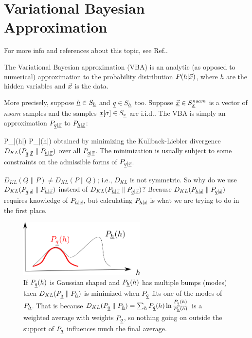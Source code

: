 \chapter{Variational Bayesian Approximation}

For more info and references about
this topic, see Ref.\cite{wiki-var-bay}.

The Variational Bayesian approximation (VBA)
is an analytic 
(as opposed to numerical) approximation
to the probability 
distribution $P(h|{\vec{x}})$,
where $h$ are the hidden variables 
and ${\vec{x}}$ is the data. 


More precisely, suppose ${\underline{h}}\in S_{\underline{h}}$ and ${\underline{q}}\in S_{\underline{h}}$ too.
Suppose $\vec{{\underline{x}}}\in S_{\underline{x}}^{nsam}$
 is a vector of $nsam$ samples
and the samples ${\underline{x}}[\sigma]\in S_{\underline{x}}$ are i.i.d..
 The VBA is simply 
an approximation
$P_{{\underline{q}}|\vec{{\underline{x}}}}$ to
$P_{{\underline{h}}|\vec{{\underline{x}}}}$:


\beq
P_{\rvh|\vec{\rvx}}(h|\vecx)
\approx P_{\rvq|\vec{\rvx}}(h|\vecx)
\eeq
obtained by minimizing the Kullback-Liebler divergence
$D_{KL}(P_{{\underline{q}}|\vec{{\underline{x}}}}\parallel
P_{{\underline{h}}|\vec{{\underline{x}}}})$
over all 
$P_{{\underline{q}}|\vec{{\underline{x}}}}$. The minimization
is 
usually subject to some constraints
on the admissible forms of 
$P_{{\underline{q}}|\vec{{\underline{x}}}}$.


$D_{KL}(Q\parallel P)\neq
D_{KL}(P\parallel Q)$; i.e.,  $D_{KL}$ is not
symmetric. So why do we use 
$D_{KL}(P_{{\underline{q}}|\vec{{\underline{x}}}}\parallel
P_{{\underline{h}}|\vec{{\underline{x}}}})$
instead of 
$D_{KL}(
P_{{\underline{h}}|\vec{{\underline{x}}}}\parallel P_{{\underline{q}}|\vec{{\underline{x}}}})$?
Because 
$D_{KL}(
P_{{\underline{h}}|\vec{{\underline{x}}}}\parallel P_{{\underline{q}}|\vec{{\underline{x}}}})$
requires knowledge of $P_{{\underline{h}}|\vec{{\underline{x}}}}$,
but calculating $P_{{\underline{h}}|\vec{{\underline{x}}}}$
is what we are trying to do in the first place.

\begin{figure}[h!]
\centering
\includegraphics[width=2.5in]
{var-bay/kl-q-support.png}
\caption{
If $P_{\underline{q}}(h)$
is Gaussian shaped 
and $P_{\underline{h}}(h)$
has multiple
bumps (modes)
then 
$D_{KL}(P_{\underline{q}}\parallel P_{\underline{h}})$
is minimized when $P_{\underline{q}}$
fits one of the modes of $P_{\underline{h}}$.
That is because $D_{KL}(P_{\underline{q}}\parallel P_{\underline{h}})=
\sum_h P_{\underline{q}}(h)\ln \frac{P_{\underline{q}}(h)}{P_{\underline{h}}(h)}$
is a weighted average with weights $P_{\underline{q}}$,
so nothing going on outside the support
of $P_{\underline{q}}$ influences  much
the final average.
}
\label{fig-kl-q-support}
\end{figure}


